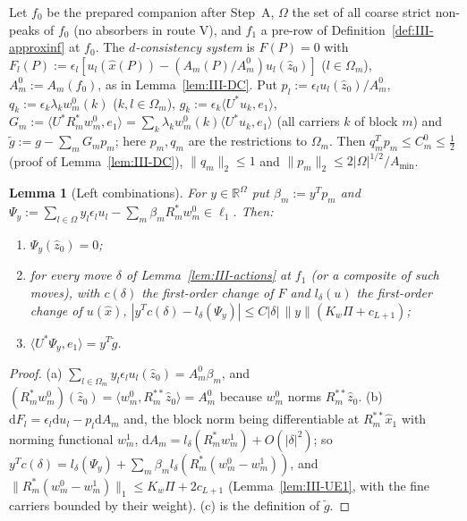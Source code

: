 \documentclass[10pt]{amsart}
\newtheorem{lemma}[theorem]{Lemma}
\theoremstyle{definition}
\theoremstyle{remark}
\newcommand{\R}{\mathbb R}
\newcommand{\zh}{\hat z}
\newcommand{\ip}[2]{\langle #1,#2\rangle}
\begin{document}
Let $f_0$ be the prepared companion after Step~A, $\Omega$ the set of all
coarse strict non-peaks of $f_0$ (no absorbers in route V), and $f_1$ a
pre-row of Definition~\ref{def:III-approxinf} at $f_0$.  The
\emph{$d$-consistency system} is $F(P)=0$ with $F_l(P):=\epsilon_l[u_l(\hat x(P))-
(A_m(P)/A^0_m)u_l(\zh_0)]$ ($l\in\Omega_m$), $A^0_m:=A_m(f_0)$, as in
Lemma~\ref{lem:III-DC}.  Put $p_l:=\epsilon_lu_l(\zh_0)/A^0_m$, $q_k:=
\epsilon_k\lambda_kw^0_m(k)$ ($k,l\in\Omega_m$), $g_k:=\epsilon_k\ip{U^*u_k}{e_1}$,
$G_m:=\ip{U^*R_m^*w^0_m}{e_1}=\sum_k\lambda_kw^0_m(k)\ip{U^*u_k}{e_1}$ (all
carriers $k$ of block $m$) and $\tilde g:=g-\sum_mG_mp_m$; here $p_m,q_m$ are
the restrictions to $\Omega_m$.  Then $q_m^Tp_m\le C^0_m\le\frac12$
(proof of Lemma~\ref{lem:III-DC}), $\|q_m\|_2\le1$ and $\|p_m\|_2\le
2|\Omega|^{1/2}/A_{\min}$.

\begin{lemma}[Left combinations]\label{lem:III-leftDC}
For $y\in\R^\Omega$ put $\beta_m:=y^Tp_m$ and $\Psi_y:=\sum_{l\in\Omega}y_l
\epsilon_lu_l-\sum_m\beta_mR_m^*w^0_m\in\ell_1$.  Then:
\begin{enumerate}
\item[(a)] $\Psi_y(\zh_0)=0$;
\item[(b)] for every move $\delta$ of Lemma~\textup{\ref{lem:III-actions}} at $f_1$
\textup{(}or a composite of such moves\textup{)}, with $c(\delta)$ the first-order
change of $F$ and $l_\delta(u)$ the first-order change of $u(\hat x)$,
$|y^Tc(\delta)-l_\delta(\Psi_y)|\le C|\delta|\,\|y\|(K_w\Pi+c_{L+1})$;
\item[(c)] $\ip{U^*\Psi_y}{e_1}=y^T\tilde g$.
\end{enumerate}
\end{lemma}

\begin{proof}
(a) $\sum_{l\in\Omega_m}y_l\epsilon_lu_l(\zh_0)=A^0_m\beta_m$, and
$(R_m^*w^0_m)(\zh_0)=\ip{w^0_m}{R_m^{**}\zh_0}=A^0_m$ because $w^0_m$ norms
$R_m^{**}\zh_0$.  (b) $\mathrm dF_l=\epsilon_l\mathrm du_l-p_l\mathrm dA_m$ and,
the block norm being differentiable at $R_m^{**}\hat x_1$ with norming functional
$w^1_m$, $\mathrm dA_m=l_\delta(R_m^*w^1_m)+O(|\delta|^2)$; so $y^Tc(\delta)=
l_\delta(\Psi_y)+\sum_m\beta_ml_\delta(R_m^*(w^0_m-w^1_m))$, and
$\|R_m^*(w^0_m-w^1_m)\|_1\le K_w\Pi+2c_{L+1}$ (Lemma~\ref{lem:III-UE1}, with the
fine carriers bounded by their weight).  (c) is the definition of $\tilde g$.
\end{proof}
\end{document}
